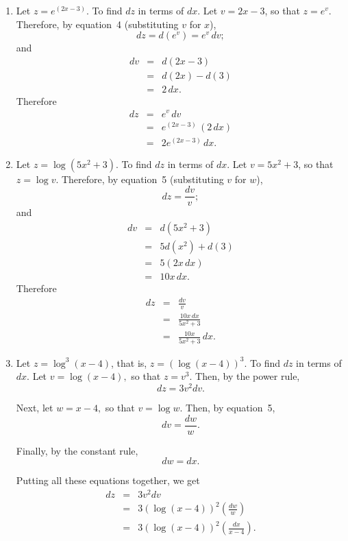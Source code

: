 \documentclass[twoside,openright]{article}
\newlength{\oldjot}
\begin{document}
\begin{enumerate}
\item Let $z = e^{(2x-3)}$.  To find $dz$ in terms of $dx$.  Let
  $v= 2x-3$, so that $z = e^v$.  Therefore, by equation~4
  (substituting $v$ for $x$),
$$dz = d(e^v) = e^v\,dv;$$
and 
\setlength{\jot}{1.5ex}
\begin{eqnarray*}
dv & = & d(2x-3)\\
& = & d(2x) -d(3)\\
& = & 2\,dx.
\end{eqnarray*}
Therefore 
\begin{eqnarray*}
dz & = & e^v\,dv \\
& = & e^{(2x-3)}\,(2\,dx)\\
& = & 2e^{(2x - 3)}\,dx.
\end{eqnarray*}

\item Let $z = \log(5x^2 + 3).$ To find $dz$ in terms of $dx$.  Let
  $v= 5x^2 + 3$, so that $z= \log v$.  Therefore, by equation~5
  (substituting $v$ for $w$),
$$dz =  \frac{dv}{v};$$
and
\begin{eqnarray*}
dv &  = & d(5x^2 + 3)\\
& = & 5d(x^2) + d(3)\\
& = & 5(2x\,dx)\\
& = & 10x\,dx.
\end{eqnarray*}
Therefore
\begin{eqnarray*}
dz & = & \frac{dv}{v} \\
& = & \frac{10x\,dx}{5x^2 + 3}\\
& = & \frac{10x}{5x^2+ 3}\,dx.
\end{eqnarray*}

\item Let $z = \log^3(x-4)$, that is, $z = (\log(x-4))^3.$ To find
  $dz$ in terms of $dx$.  Let $v= \log(x-4),$ so that $z = v^3.$ Then,
  by the power rule,
$$dz = 3v^2dv.$$

Next, let $w = x-4,$ so that $v = \log w$.  Then, by equation~5,
$$dv = \frac{dw}{w}.$$

Finally, by the constant rule, 
$$dw = dx.$$

Putting all these equations together, we get
\begin{eqnarray*}
dz & = & 3v^2dv\\
& = & 3(\log(x-4))^2\left(\frac{dw}{w}\right)\\
& = & 3(\log(x-4))^2\left(\frac{dx}{x-4}\right).
\end{eqnarray*}

\setlength{\jot}{\oldjot}
\end{enumerate}
\end{document}
